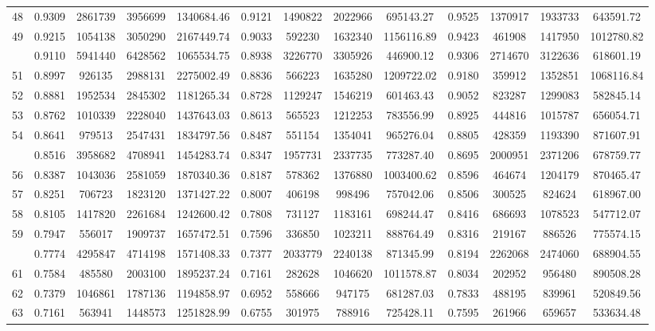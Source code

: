 \documentclass[
  12pt,
]{article}
\begin{document}
\begin{longtable}[t]{lcccccccccccc}
48 & 0.9309 & 2861739 & 3956699 & 1340684.46 & 0.9121 & 1490822 & 2022966 & 695143.27 & 0.9525 & 1370917 & 1933733 & 643591.72\\
49 & 0.9215 & 1054138 & 3050290 & 2167449.74 & 0.9033 & 592230 & 1632340 & 1156116.89 & 0.9423 & 461908 & 1417950 & 1012780.82\\
\addlinespace
50 & 0.9110 & 5941440 & 6428562 & 1065534.75 & 0.8938 & 3226770 & 3305926 & 446900.12 & 0.9306 & 2714670 & 3122636 & 618601.19\\
51 & 0.8997 & 926135 & 2988131 & 2275002.49 & 0.8836 & 566223 & 1635280 & 1209722.02 & 0.9180 & 359912 & 1352851 & 1068116.84\\
52 & 0.8881 & 1952534 & 2845302 & 1181265.34 & 0.8728 & 1129247 & 1546219 & 601463.43 & 0.9052 & 823287 & 1299083 & 582845.14\\
53 & 0.8762 & 1010339 & 2228040 & 1437643.03 & 0.8613 & 565523 & 1212253 & 783556.99 & 0.8925 & 444816 & 1015787 & 656054.71\\
54 & 0.8641 & 979513 & 2547431 & 1834797.56 & 0.8487 & 551154 & 1354041 & 965276.04 & 0.8805 & 428359 & 1193390 & 871607.91\\
\addlinespace
55 & 0.8516 & 3958682 & 4708941 & 1454283.74 & 0.8347 & 1957731 & 2337735 & 773287.40 & 0.8695 & 2000951 & 2371206 & 678759.77\\
56 & 0.8387 & 1043036 & 2581059 & 1870340.36 & 0.8187 & 578362 & 1376880 & 1003400.62 & 0.8596 & 464674 & 1204179 & 870465.47\\
57 & 0.8251 & 706723 & 1823120 & 1371427.22 & 0.8007 & 406198 & 998496 & 757042.06 & 0.8506 & 300525 & 824624 & 618967.00\\
58 & 0.8105 & 1417820 & 2261684 & 1242600.42 & 0.7808 & 731127 & 1183161 & 698244.47 & 0.8416 & 686693 & 1078523 & 547712.07\\
59 & 0.7947 & 556017 & 1909737 & 1657472.51 & 0.7596 & 336850 & 1023211 & 888764.49 & 0.8316 & 219167 & 886526 & 775574.15\\
\addlinespace
60 & 0.7774 & 4295847 & 4714198 & 1571408.33 & 0.7377 & 2033779 & 2240138 & 871345.99 & 0.8194 & 2262068 & 2474060 & 688904.55\\
61 & 0.7584 & 485580 & 2003100 & 1895237.24 & 0.7161 & 282628 & 1046620 & 1011578.87 & 0.8034 & 202952 & 956480 & 890508.28\\
62 & 0.7379 & 1046861 & 1787136 & 1194858.97 & 0.6952 & 558666 & 947175 & 681287.03 & 0.7833 & 488195 & 839961 & 520849.56\\
63 & 0.7161 & 563941 & 1448573 & 1251828.99 & 0.6755 & 301975 & 788916 & 725428.11 & 0.7595 & 261966 & 659657 & 533634.48\\

\end{longtable}
\end{document}
